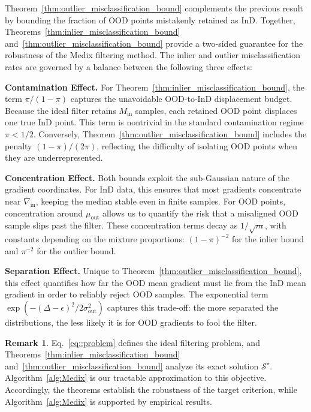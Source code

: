 \documentclass[10pt]{article} %
\theoremstyle{plain}
\theoremstyle{definition}
\newtheorem{remark}[theorem]{Remark}
\begin{document}
Theorem~\ref{thm:outlier_misclassification_bound} complements the previous result by bounding the fraction of OOD points mistakenly retained as InD. Together, Theorems~\ref{thm:inlier_misclassification_bound} and~\ref{thm:outlier_misclassification_bound} provide a two-sided guarantee for the robustness of the Medix filtering method. The inlier and outlier misclassification rates are governed by a balance between the following three effects:

\textbf{Contamination Effect.} For Theorem~\ref{thm:inlier_misclassification_bound}, the term
$\pi/(1-\pi)$ captures the unavoidable OOD-to-InD displacement budget. Because the ideal filter retains $M_{\mathrm{in}}$ samples, each retained OOD point displaces one true InD point. This term is nontrivial in the standard contamination regime $\pi<1/2$. Conversely, Theorem~\ref{thm:outlier_misclassification_bound} includes the penalty $(1-\pi)/(2\pi)$, reflecting the difficulty of isolating OOD points when they are underrepresented.

\textbf{Concentration Effect.} Both bounds exploit the sub-Gaussian nature of the gradient coordinates. For InD data, this ensures that most gradients concentrate near $\bar{\nabla}_{\mathrm{in}}$, keeping the median stable even in finite samples. For OOD points, concentration around $\mu_{\mathrm{out}}$ allows us to quantify the risk that a misaligned OOD sample slips past the filter. These concentration terms decay as $1/\sqrt{m}$, with constants depending on the mixture proportions: $(1-\pi)^{-2}$ for the inlier bound and $\pi^{-2}$ for the outlier bound.

\textbf{Separation Effect.} Unique to Theorem~\ref{thm:outlier_misclassification_bound}, this effect quantifies how far the OOD mean gradient must lie from the InD mean gradient in order to reliably reject OOD samples. The exponential term $\exp(-(\Delta - \epsilon)^2 / 2\sigma_{\mathrm{out}}^2)$ captures this trade-off: the more separated the distributions, the less likely it is for OOD gradients to fool the filter.

\begin{tcolorbox}[
  colback=PurpleBack,
  colframe=PurpleBox,
  arc=1.5pt,
  boxrule=1pt,
    left=6pt,right=6pt,top=6pt,bottom=6pt,
    breakable
]
\begin{remark}\label{rem:approx}
Eq.~\ref{eq::problem} defines the ideal filtering problem, and Theorems~\ref{thm:inlier_misclassification_bound} and~\ref{thm:outlier_misclassification_bound} analyze its exact solution \(\mathcal{S}^\star\). Algorithm~\ref{alg:Medix} is our tractable approximation to this objective. Accordingly, the theorems establish the robustness of the target criterion, while Algorithm~\ref{alg:Medix} is supported by empirical results.
\end{remark}
\end{tcolorbox}
\end{document}
